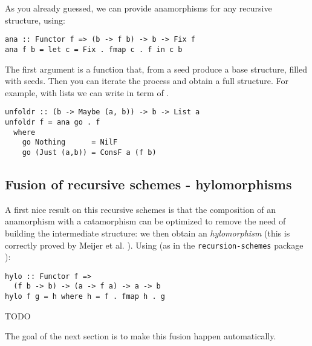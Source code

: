 As you already guessed, we can provide anamorphisms for any recursive structure, using:
\begin{verbatim}
ana :: Functor f => (b -> f b) -> b -> Fix f
ana f b = let c = Fix . fmap c . f in c b
\end{verbatim}
The first argument is a function that, from a seed produce a base structure, filled with seeds. Then you can iterate the process and obtain a full structure. For example, with lists we can write  in term of .
\begin{verbatim}
unfoldr :: (b -> Maybe (a, b)) -> b -> List a
unfoldr f = ana go . f
  where
    go Nothing      = NilF
    go (Just (a,b)) = ConsF a (f b)
\end{verbatim}

\subsection{Fusion of recursive schemes - hylomorphisms}
A first nice result on this recursive schemes is that the composition of an anamorphism with a catamorphism can be optimized to remove the need of building the intermediate structure: we then obtain an \emph{hylomorphism} (this is correctly proved by Meijer et al. \cite{4cec4a43c86444479dc0003182424795}).
Using (as in the \verb|recursion-schemes| package \cite{ekmett:eschems}):
\begin{verbatim}
hylo :: Functor f =>
  (f b -> b) -> (a -> f a) -> a -> b
hylo f g = h where h = f . fmap h . g
\end{verbatim}

TODO

The goal of the next section is to make this fusion happen automatically.